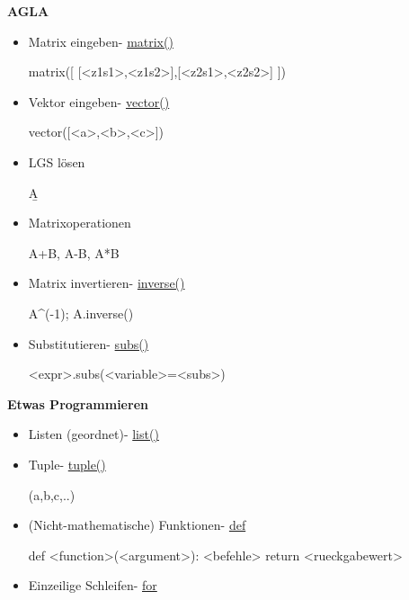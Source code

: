 \documentclass[a4paper,9pt,DIV15,twocolumn]{scrartcl}
\begin{document}
\textbf{AGLA}
\begin{itemize}
\item Matrix eingeben- \href{https://sage.math.uni-goettingen.de/doc/static/reference/sage/matrix/constructor.html#sage.matrix.constructor.Matrix}{matrix()}
\begin{sagein}
matrix([ [<z1s1>,<z1s2>],[<z2s1>,<z2s2>] ])
\end{sagein}
 \item Vektor eingeben- \href{https://sage.math.uni-goettingen.de/doc/static/reference/sage/modules/free_module_element.html#sage.modules.free_module_element.vector}{vector()}
\begin{sagein}
vector([<a>,<b>,<c>])
\end{sagein}
\item LGS lösen 
\begin{sagein}
A\b
\end{sagein}
\item Matrixoperationen 
\begin{sagein}
A+B, A-B, A*B
\end{sagein}
\item Matrix invertieren- \href{https://sage.math.uni-goettingen.de/doc/static/reference/sage/matrix/matrix2.html?highlight=matrix.inverse#sage.matrix.matrix2.Matrix.inverse}{inverse()}
\begin{sagein}
A^(-1); A.inverse()
\end{sagein}
\item Substitutieren- \href{https://sage.math.uni-goettingen.de/doc/static/reference/sage/crypto/mq/mpolynomialsystem.html#sage.crypto.mq.mpolynomialsystem.MPolynomialRoundSystem_generic.subs}{subs()}
\begin{sagein}
<expr>.subs(<variable>=<subs>)
\end{sagein}
\end{itemize}

\textbf{Etwas Programmieren}
\begin{itemize}
    \item Listen (geordnet)- \href{http://docs.python.org/library/functions.html#list}{list()}
        \begin{sagein}
[a,b,c,..]
        \end{sagein}
    \item Tuple- \href{http://docs.python.org/library/functions.html#tuple}{tuple()}
        \begin{sagein}
(a,b,c,..)
        \end{sagein}
    \item (Nicht-mathematische) Funktionen- \href{http://docs.python.org/reference/compound_stmts.html#function-definitions}{def}
\begin{sagein}
def <function>(<argument>): <befehle> return <rueckgabewert>
\end{sagein}
    \item Einzeilige Schleifen- \href{http://docs.python.org/tutorial/controlflow.html#for-statements}{for}
\begin{sagein}
\end{sagein}
\end{itemize}
\end{document}

